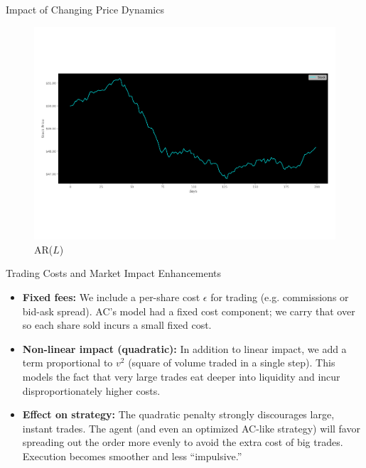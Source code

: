 \documentclass[11pt,aspectratio=169]{beamer}   %
\begin{document}
\begin{frame}{Impact of Changing Price Dynamics}
	\begin{figure}[ht]
		\centering
		\includegraphics[width=0.8\linewidth]{arl.pdf}
		\caption{AR($L$)}
	\end{figure}
\end{frame}

		\begin{frame}{Trading Costs and Market Impact Enhancements}
			\begin{itemize}
				\item \textbf{Fixed fees:} We include a per-share cost $\epsilon$ for trading (e.g. commissions or bid-ask spread). AC’s model had a fixed cost component; we carry that over so each share sold incurs a small fixed cost.
				\item \textbf{Non-linear impact (quadratic):} In addition to linear impact, we add a term proportional to $v^2$ (square of volume traded in a single step). This models the fact that very large trades eat deeper into liquidity and incur disproportionately higher costs.
				\item \textbf{Effect on strategy:} The quadratic penalty strongly discourages large, instant trades. The agent (and even an optimized AC-like strategy) will favor spreading out the order more evenly to avoid the extra cost of big trades. Execution becomes smoother and less “impulsive.”
			\end{itemize}
			\vspace{0.5em}
		\end{frame}
		
\end{document}
